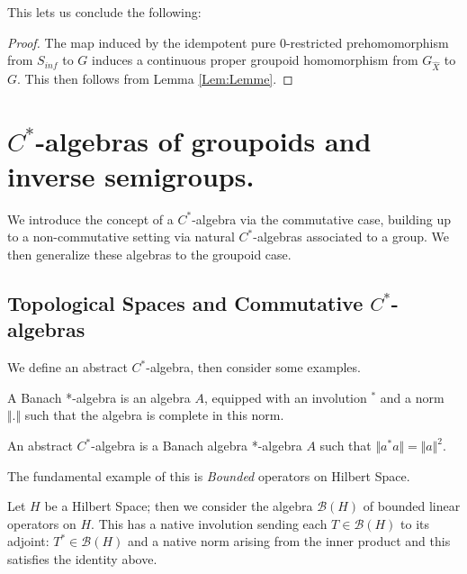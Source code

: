 This lets us conclude the following:
\begin{proof}
The map induced by the idempotent pure 0-restricted prehomomorphism from $S_{inf}$ to $G$ induces a continuous proper groupoid homomorphism from $G_{\widehat{X}}$ to $G$. This then follows from Lemma \ref{Lem:Lemme}.\end{proof}

\section{\texorpdfstring{$C^{*}$}{C*}-algebras of groupoids and inverse semigroups.}

We introduce the concept of a $C^{*}$-algebra via the commutative case, building up to a non-commutative setting via natural $C^{*}$-algebras associated to a group. We then generalize these algebras to the groupoid case.

\subsection{Topological Spaces and Commutative $C^{*}$-algebras}

We define an abstract $C^{*}$-algebra, then consider some examples.

\begin{definition}
A Banach *-algebra is an algebra $A$, equipped with an involution $^{*}$ and a norm $\Vert . \Vert$ such that the algebra is complete in this norm.
\end{definition}

\begin{definition}
An abstract $C^{*}$-algebra is a Banach algebra *-algebra $A$ such that $\Vert a^{*}a \Vert = \Vert a \Vert^{2}$.
\end{definition}

The fundamental example of this is \textit{Bounded} operators on Hilbert Space.

\begin{example}
Let $H$ be a Hilbert Space; then we consider the algebra $\mathcal{B}(H)$ of bounded linear operators on $H$. This has a native involution sending each $T \in \mathcal{B}(H)$ to its adjoint: $T^{*} \in \mathcal{B}(H)$ and a native norm arising from the inner product and this satisfies the identity above.
\end{example}

